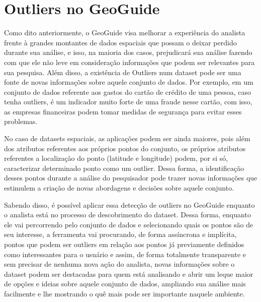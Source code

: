 \section{Outliers no GeoGuide}

Como dito anteriormente, o GeoGuide visa melhorar a experiência do analista frente à grandes montantes de dados espaciais que possam o deixar perdido durante sua análise, e isso, na maioria dos casos, prejudicará sua análise fazendo com que ele não leve em consideração informações que podem ser relevantes para sua pesquisa. Além disso, a existência de Outliers num dataset pode ser uma fonte de novas informações sobre aquele conjunto de dados. Por exemplo, em um conjunto de dados referente aos gastos do cartão de crédito de uma pessoa, caso tenha outliers, é um indicador muito forte de uma fraude nesse cartão, com isso, as empresas financeiras podem tomar medidas de segurança para evitar esses problemas.

No caso de datasets espaciais, as aplicações podem ser ainda maiores, pois além dos atributos referentes aos próprios pontos do conjunto, os próprios atributos referentes a localização do ponto (latitude e longitude) podem, por si só, caracterizar determinado ponto como um outlier. Dessa forma, a identificação desses pontos durante a análise do pesquisador pode trazer novas informações que estimulem a criação de novas abordagens e decisões sobre aquele conjunto.

Sabendo disso, é possível aplicar essa detecção de outliers no GeoGuide enquanto o analista está no processo de descobrimento do dataset. Dessa forma, enquanto ele vai percorrendo pelo conjunto de dados e selecionando quais os pontos são de seu interesse, a ferramenta vai procurando, de forma assíncrona e implícita, pontos que podem ser outliers em relação aos pontos já previamente definidos como interessantes para o usuário e assim, de forma totalmente transparente e sem precisar de nenhuma nova ação do analista, novas informações sobre o dataset podem ser destacadas para quem está analisando e abrir um leque maior de opções e ideias sobre aquele conjunto de dados, ampliando sua análise mais facilmente e lhe mostrando o quê mais pode ser importante naquele ambiente.

